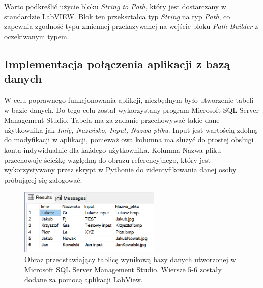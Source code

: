 \documentclass{report}
\begin{document}
Warto podkreślić użycie bloku \textit{String to Path}, który jest dostarczany w standardzie LabVIEW. Blok ten przekształca typ \textit{String} na typ \textit{Path}, co zapewnia zgodność typu zmiennej przekazywanej na wejście bloku \textit{Path Builder} z oczekiwanym typem.



\subsection{\Large Implementacja połączenia aplikacji z bazą danych}

%
%
W celu poprawnego funkcjonowania aplikcji, niezbędnym było utworzenie tabeli w bazie danych. Do tego celu został wykorzystany program 
Microsoft SQL Server Management Studio. Tabela ma za zadanie przechowywać takie dane użytkownika jak \textit{Imię, Nazwisko, Input, Nazwa pliku}.
Input jest wartością zdolną do modyfikacji w aplikacji, ponieważ owa kolumna ma służyć do prostej obsługi konta indywidualnie dla każdego użytkownika.
Kolumna Nazwa pliku przechowuje ścieżkę względną do obrazu referencyjnego, który jest wykorzystywany przez skrypt w Pythonie do zidentyfikowania danej
osoby próbującej się zalogować.

\begin{figure}[H]
    \centering
    \includegraphics[width=0.6\textwidth]{src/Database/Microsoft SQL.png}
    \caption{Obraz przedstawiający tablicę wynikową bazy danych utworzonej w Microsoft SQL Server Management Studio. Wiersze 5-6 zostały dodane za pomocą aplikacji LabView.}
    \label{fig:first-att}
\end{figure}
\end{document}

